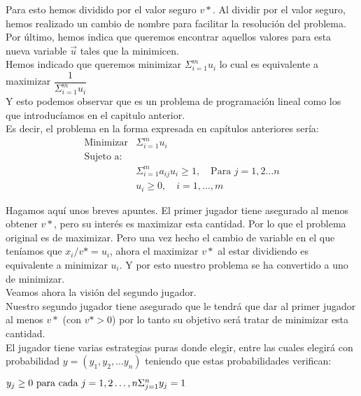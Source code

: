 \documentclass[10pt,a4paper]{book}
\begin{document}
Para esto hemos dividido por el valor seguro $v*$. Al dividir por el valor seguro, hemos realizado un cambio de nombre para facilitar la resolución del problema.\\

Por último, hemos indica que queremos encontrar aquellos valores para esta nueva variable $\vec{u}$ tales que la minimicen. \\

Hemos indicado que queremos minimizar $\Sigma^m_{i=1}u_i$ lo cual es equivalente a maximizar $\dfrac{1}{\Sigma^m_{i=1}u_i}$\\

Y esto podemos observar que es un problema de programación lineal como los que introducíamos en el capitulo anterior.\\

Es decir, el problema en la forma expresada en capítulos anteriores sería:\\

$$\begin{array}{lc}
\mbox{Minimizar} & \Sigma^m_{i=1}u_i\\
\mbox{Sujeto a:}  \\
&  \Sigma^m_{i=1} a_{ij}u_i \geq 1, \quad \mbox{Para } j=1,2 \ldots n\\
&u_i \geq 0, \quad i=1, \ldots ,m
\end{array}$$

Hagamos aquí unos breves apuntes. El primer jugador tiene asegurado al menos obtener $v*$, pero su interés es maximizar esta cantidad. Por lo que el problema original es de maximizar. Pero una vez hecho el cambio de variable en el que teníamos que $x_i/v*=u_i$, ahora el maximizar $v*$ al estar dividiendo es equivalente a minimizar $u_i$. Y por esto nuestro problema se ha convertido a uno de minimizar.\\


Veamos ahora la visión del segundo jugador.\\

Nuestro segundo jugador tiene asegurado que le tendrá que dar al primer jugador al menos $v*$ (con $v* >0$) por lo tanto su objetivo será tratar de minimizar esta cantidad.\\

El jugador tiene varias estrategias puras donde elegir, entre las cuales elegirá con probabilidad $y=(y_1,y_2, \ldots y_n)$ teniendo que estas probabilidades verifican:\\

\begin{center}

$y_j \geq 0 \mbox{ para cada } j=1,2\ldots,n \newline
\Sigma^n_{j=1} y_j=1$

\end{center}
\end{document}
